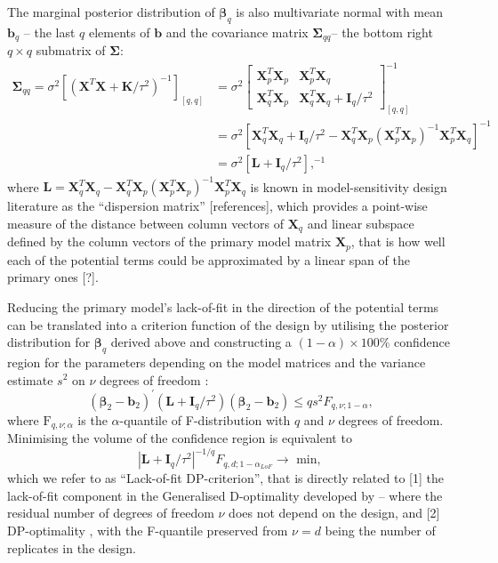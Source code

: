 The marginal posterior distribution of $\bm{\beta}_q$ is also multivariate normal with mean $\bm{b}_q$ -- the last $q$ elements of $\bm{b}$ and the covariance matrix $\bm{\Sigma}_{qq}$-- the bottom right $q \times q $ submatrix of $\bm{\Sigma}$:
\begin{align*}
\bm{\Sigma}_{qq} = \sigma^{2}[(\bm{X}^T\bm{X} +  \bm{K}/\tau^{2})^{-1}]_{[q,q]} &= 
\sigma^{2}\begin{bmatrix}
\bm{X}^T_p\bm{X}_p& \bm{X}^T_p\bm{X}_q \\
\bm{X}^T_q\bm{X}_p& \bm{X}^T_q\bm{X}_q+\bm{I}_{q}/\tau^{2}
\end{bmatrix}^{-1}_{[q,q]}\\&=
\sigma^{2}[\bm{X}^T_q\bm{X}_q+\bm{I}_{q}/\tau^{2}-\bm{X}^T_q\bm{X}_p(\bm{X}^T_p\bm{X}_p)^{-1}\bm{X}^T_p\bm{X}_q]^{-1}\\&=\sigma^{2}\left[\bm{L}+\bm{I}_{q}/\tau^{2}\right],^{-1}
\end{align*} 
where $\bm{L} = \bm{X}^T_q\bm{X}_q-\bm{X}^T_q\bm{X}_p(\bm{X}^T_p\bm{X}_p)^{-1}\bm{X}^T_p\bm{X}_q$ is known in model-sensitivity design literature as the ``dispersion matrix'' [references], which provides a point-wise measure of the distance between column vectors of $\bm{X}_q$ and linear subspace defined by the column vectors of the primary model matrix $\bm{X}_p$, that is how well each of the potential terms could be approximated by a linear span of the primary ones [?].

Reducing the primary model's lack-of-fit in the direction of the potential terms can be translated into a criterion function of the design by utilising the posterior distribution for $\bm{\beta}_q$ derived above and constructing a $(1-\alpha)\times100\%$ confidence region for the parameters depending on the model matrices and the variance estimate $s^2$ on $\nu$ degrees of freedom \citep{Draper1998}:
\begin{equation*}
(\bm{\beta}_{2}-\bm{b}_{2})^{'}(\bm{L}+\bm{I}_{q}/\tau^{2})(\bm{\beta}_{2}-\bm{b}_{2})\leq qs^{2}F_{q,\nu;1-\alpha},
\end{equation*}
where $\mathrm{F}_{q,\nu; \alpha}$ is the $\alpha$-quantile of F-distribution with $q$ and $\nu$ degrees of freedom.
Minimising the volume of the confidence region is equivalent to 
\begin{equation}
\label{eq::LoFDP_criterion}
\left|\bm{L}+\bm{I}_{q}/\tau^{2}\right|^{-1/q}F_{q,d;1-\alpha_{LoF}} \longrightarrow \mbox{ min, }  
\end{equation}  
which we refer to as ``Lack-of-fit DP-criterion'', that is directly related to [1] the lack-of-fit component in the Generalised D-optimality developed by \cite{Goos2005model} -- where the residual number of degrees of freedom $\nu$ does not depend on the design, and [2] DP-optimality \citep{GilmourTrinca2012}, with the F-quantile preserved from $\nu = d$ being the number of replicates in the design. 

